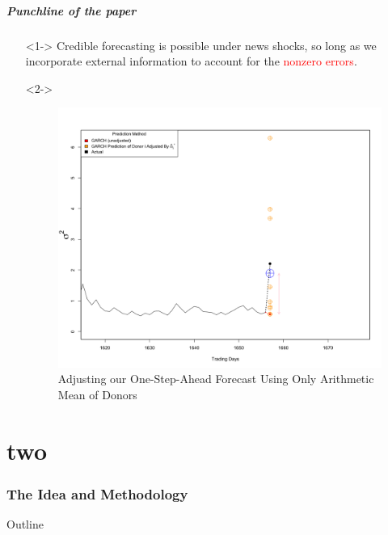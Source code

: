 \documentclass[9pt]{beamer}
\theoremstyle{definition}
\begin{document}
\begin{frame}
    \frametitle{Punchline of the paper}
    
    \begin{itemize}
        \item[] <1-> Credible forecasting is possible under news shocks, so long as we incorporate external information to account for the \textcolor{red}{nonzero errors}.
        \item[] <2-> \begin{figure}[H]
            \begin{center}
              \includegraphics[scale=.1]{simulation_plots/motivating_piece_convex_combination.png}
              \caption{Adjusting our One-Step-Ahead Forecast Using Only Arithmetic Mean of Donors}
              \end{center}
            \end{figure}
    \end{itemize}
    \end{frame}

\part{two}

\section{The Idea and Methodology}

\begin{frame}{Outline} %
    \tableofcontents[part=1,currentsection]\tableofcontents
\end{frame}
\end{document}
